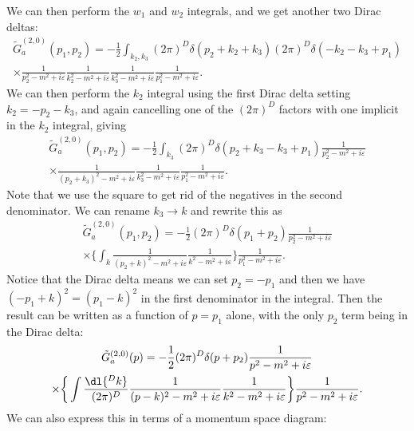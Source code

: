 \documentclass[fleqn]{NotesClass}
\begin{document}
    We can then perform the \(w_1\) and \(w_2\) integrals, and we get another two Dirac deltas:
    \begin{multline}
        \tilde{G}^{(2, 0)}_a(p_1, p_2) = -\frac{1}{2} \int_{k_2, k_3} (2\pi)^D\delta(p_2 + k_2 + k_3) (2\pi)^D\delta(-k_2 - k_3 + p_1)\\
        \times \frac{1}{p_2^2 - m^2 + i\varepsilon} \frac{1}{k_2^2 - m^2 + i\varepsilon} \frac{1}{k_3^2 - m^2 + i\varepsilon} \frac{1}{p_1^2 - m^2 + i\varepsilon}.
    \end{multline}
    We can then perform the \(k_2\) integral using the first Dirac delta setting \(k_2 = -p_2 - k_3\), and again cancelling one of the \((2\pi)^D\) factors with one implicit in the \(k_2\) integral, giving
    \begin{multline}
        \tilde{G}^{(2, 0)}_a(p_1, p_2) = -\frac{1}{2} \int_{k_3} (2\pi)^D\delta(p_2 + k_3 - k_3 + p_1) \frac{1}{p_2^2 - m^2 + i\varepsilon}\\
        \times \frac{1}{(p_2 + k_3)^2 - m^2 + i\varepsilon} \frac{1}{k_3^2 - m^2 + i\varepsilon} \frac{1}{p_1^2 - m^2 + i\varepsilon}.
    \end{multline}
    Note that we use the square to get rid of the negatives in the second denominator.
    We can rename \(k_3 \to k\) and rewrite this as
    \begin{multline}
        \tilde{G}^{(2, 0)}_a(p_1, p_2) = -\frac{1}{2} (2\pi)^D\delta(p_1 + p_2) \frac{1}{p_2^2 - m^2 + i\varepsilon}\\
        \times \bigg\{ \int_{k} \frac{1}{(p_2 + k)^2 - m^2 + i\varepsilon} \frac{1}{k^2 - m^2 + i\varepsilon} \bigg\} \frac{1}{p_1^2 - m^2 + i\varepsilon}.
    \end{multline}
    Notice that the Dirac delta means we can set \(p_2 = -p_1\) and then we have \((-p_1 + k)^2 = (p_1 - k)^2\) in the first denominator in the integral.
    Then the result can be written as a function of \(p = p_1\) alone, with the only \(p_2\) term being in the Dirac delta:
    \begin{multline}
        \tilde{G}^{(2, 0)}_a(p) = -\frac{1}{2} (2\pi)^D\delta(p + p_2) \frac{1}{p^2 - m^2 + i\varepsilon}\\
        \times \bigg\{ \int \frac{\dl{^Dk}}{(2\pi)^D} \frac{1}{(p - k)^2 - m^2 + i\varepsilon} \frac{1}{k^2 - m^2 + i\varepsilon} \bigg\} \frac{1}{p^2 - m^2 + i\varepsilon}.
    \end{multline}
    We can also express this in terms of a momentum space diagram:
\end{document}
